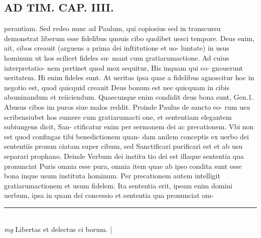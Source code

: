 \documentclass{article}
\begin{document}
\begin{pages}
\section*{AD TIM. CAP. IIII. }
\marginpar{[ p.140 ]}\pstart perantiam. Sed redeo nunc ad Paulum, qui copiosius sed in transcursu demonstrat liberum esse fidelibus quouis cibo quolibet uesci tempore. Deus enim, ait, cibos creauit (arguens a prima dei inftitutione et uo- luntate) in usus hominum ut hos scilicet fideles su- mant cum gratiarumactione. Ad cuius interpretatio- nem pertinet quod mox sequitur, His inquam qui co- gnouerunt ueritatem. Hi enim fideles sunt. At ueritas ipsa quae a fidelibus agnoscitur hoc in negotio est, quod quicquid creauit Deus bonum est nec quicquam in cibis abominandum et reiiciendum. Quaecunque  enim condidit deus bona sunt, Gen.1. Abusus cibos im puros siue malos reddit. Proinde Paulus de sancto eo- rum usu scribensiubet hos sumere cum gratiarumacti one, et sententiam elegantem subiungens dicit, San- ctificatur enim per sermonem dei ac precationem. Vbi non est quod confingas tibi benedictionem quan- dam anilem conceptis ex uerbo dei sententiis pronun ciatam super cibum, sed Sanctificari purificari est et ab usu separari prophano. Deinde Verbum dei institu tio dei est illaque sententia qua pronunciat Puris omnia esse pura, omnia item quae ab ipso condita sunt esse bona inque usum instituta hominum. Per precationem autem intelligit gratiarumactionem et usum fidelem. Ita sententia erit, ipsum enim domini uerbum, ipsa in quam dei concessio et sententia qua pronunciat om-  \pend
\vspace{0.5cm}\noindent
\vspace{0.2cm}\rule{1cm}{0.2pt}\\ 
\hspace{0.2cm}\textit{mg}
\footnotesize Libertas et delectus ci borum. 
\normalsize| 

\end{pages}
\end{document}
